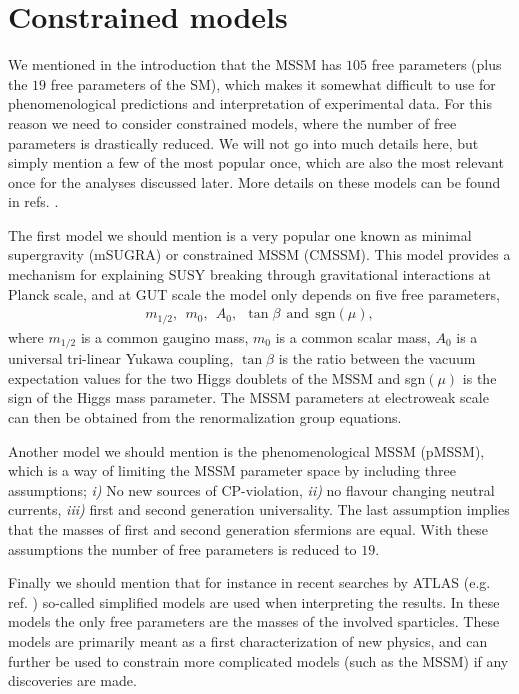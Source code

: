 \documentclass[twocolumn,a4paper,10pt]{article}
\begin{document}
\section{Constrained models}

We mentioned in the introduction that the MSSM has $105$ free parameters (plus the $19$ free parameters 
of the SM), which makes it somewhat difficult to use for phenomenological predictions and interpretation 
of experimental data. For this reason we need to consider constrained models, where the number of 
free parameters is drastically reduced. We will not go into much details here, but simply mention a 
few of the most popular once, which are also the most relevant once for the analyses discussed later.  
More details on these models can be found in refs. \cite{Constrained models, Simplified models}. 

The first model we should mention is a very popular one known as minimal supergravity (mSUGRA) or 
constrained MSSM (CMSSM). This model provides a mechanism for explaining SUSY breaking through 
gravitational interactions at Planck scale, and at GUT scale the model only depends on five free 
parameters,  
\begin{align*}
m_{1/2},\:\: m_0, \:\: A_0, \:\: \tan\beta \:\:\text{and}\:\: \text{sgn}(\mu), 
\end{align*}
where $m_{1/2}$ is a common gaugino mass, $m_0$ is a common scalar mass, $A_0$ is a universal tri-linear 
Yukawa coupling, $\tan\beta$ is the ratio between the vacuum expectation values for the two Higgs 
doublets of the MSSM and sgn$(\mu)$ is the sign of the Higgs mass parameter. The MSSM parameters at 
electroweak scale can then be obtained from the renormalization group equations.      

Another model we should mention is the phenomenological MSSM (pMSSM), which is a way of limiting the 
MSSM parameter space by including three assumptions; \textit{i)} No new sources of CP-violation, 
\textit{ii)} no flavour changing neutral currents, \textit{iii)} first and second generation universality. 
The last assumption implies that the masses of first and second generation sfermions are equal. With 
these assumptions the number of free parameters is reduced to $19$.  

Finally we should mention that for instance in recent searches by ATLAS (e.g. ref. \cite{ATLAS:2017}) 
so-called simplified models \cite{Simplified models} are used when interpreting the results. In these 
models the only free parameters are the masses of the involved sparticles. These models are primarily 
meant as a first characterization of new physics, and can further be used to constrain more complicated 
models (such as the MSSM) if any discoveries are made.  
\end{document}

